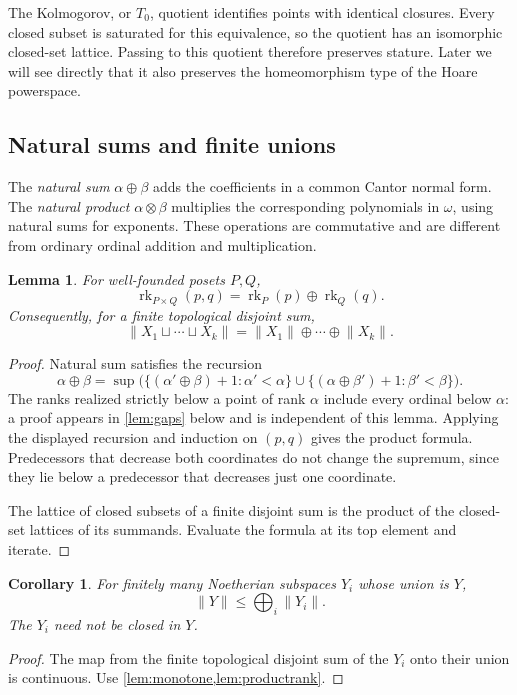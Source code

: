 \documentclass[11pt,a4paper]{article}
\newtheorem{lemma}[lemma]{Lemma}
\newtheorem{corollary}[corollary]{Corollary}
\theoremstyle{definition}
\newcommand{\rk}{\operatorname{rk}}
\newcommand{\st}[1]{\lVert #1\rVert}
\newcommand{\ds}{\mathbin{\sqcup}}
\newcommand{\natsum}{\mathop{\bigoplus}}
\numberwithin{equation}{section}
\begin{document}
The Kolmogorov, or $T_0$, quotient identifies points with identical
closures.  Every closed subset is saturated for this equivalence, so the
quotient has an isomorphic closed-set lattice.  Passing to this quotient
therefore preserves stature.  Later we will see directly that it also
preserves the homeomorphism type of the Hoare powerspace.

\subsection{Natural sums and finite unions}

The \emph{natural sum} $\alpha\oplus\beta$ adds the coefficients in a
common Cantor normal form.  The \emph{natural product}
$\alpha\otimes\beta$ multiplies the corresponding polynomials in $\omega$,
using natural sums for exponents.  These operations are commutative and
are different from ordinary ordinal addition and multiplication.

\begin{lemma}\label{lem:productrank}
For well-founded posets $P,Q$,
\[
 \rk_{P\times Q}(p,q)=\rk_P(p)\oplus\rk_Q(q).
\]
Consequently, for a finite topological disjoint sum,
\[
 \st{X_1\ds\cdots\ds X_k}=
 \st{X_1}\oplus\cdots\oplus\st{X_k}.
\]
\end{lemma}
\begin{proof}
Natural sum satisfies the recursion
\[
 \alpha\oplus\beta=
 \sup\bigl(\{(\alpha'\oplus\beta)+1:\alpha'<\alpha\}
 \cup\{(\alpha\oplus\beta')+1:\beta'<\beta\}\bigr).
\]
The ranks realized strictly below a point of rank $\alpha$ include every
ordinal below $\alpha$: a proof appears in \cref{lem:gaps} below and is
independent of this lemma.  Applying the displayed recursion and induction
on $(p,q)$ gives the product formula.  Predecessors that decrease both
coordinates do not change the supremum, since they lie below a predecessor
that decreases just one coordinate.

The lattice of closed subsets of a finite disjoint sum is the product
of the closed-set lattices of its summands.  Evaluate the formula at its
top element and iterate.
\end{proof}

\begin{corollary}\label{cor:union}
For finitely many Noetherian subspaces $Y_i$ whose union is $Y$,
\[
 \st Y\leq\natsum_i\st{Y_i}.
\]
The $Y_i$ need not be closed in $Y$.
\end{corollary}
\begin{proof}
The map from the finite topological disjoint sum of the $Y_i$ onto their
union is continuous.  Use \cref{lem:monotone,lem:productrank}.
\end{proof}
\end{document}
